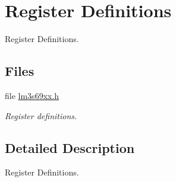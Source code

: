 \hypertarget{group__lm3s69xx__reg}{}\section{Register Definitions}
\label{group__lm3s69xx__reg}


Register Definitions.  


\subsection*{Files}
\begin{DoxyCompactItemize}
\item 
file \mbox{\hyperlink{lm3s69xx_8h}{lm3s69xx.\+h}}
\begin{DoxyCompactList}\small\item\em Register definitions. \end{DoxyCompactList}\end{DoxyCompactItemize}


\subsection{Detailed Description}
Register Definitions. 

